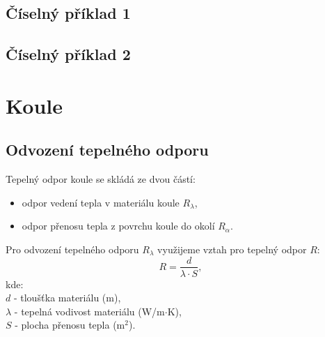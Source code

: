 \documentclass{article}
\begin{document}
\subsection{Číselný příklad 1 \spicy \spicy}



\subsection{Číselný příklad 2 \spicy \spicy}



\section{Koule \spicy \spicy \spicy}


\subsection{Odvození tepelného odporu}

\begin{center}
\end{center}

Tepelný odpor koule se skládá ze dvou částí:
\begin{itemize}
    \item odpor vedení tepla v materiálu koule $R_{\lambda}$,
    \item odpor přenosu tepla z povrchu koule do okolí $R_{\alpha}$.
\end{itemize}

Pro odvození tepelného odporu $R_{\lambda}$ využijeme vztah pro tepelný odpor $R$:
$$
    R = \frac{d}{\lambda \cdot S},
$$
kde:\\
$d$ - tloušťka materiálu (m),\\
$\lambda$ - tepelná vodivost materiálu (W/m$\cdot$K),\\
$S$ - plocha přenosu tepla (m$^2$).\\
\end{document}
